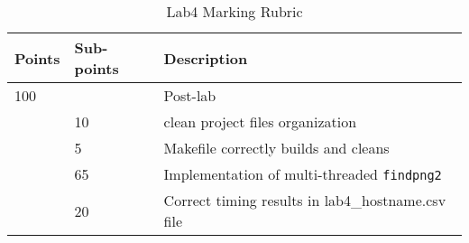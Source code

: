 \begin{table}[ht]
\begin{center}
\begin{tabular}{|p{2cm}|p{2cm}|p{9cm}|}
\hline
Points & Sub-points &Description  \\ \hline
100    &       & Post-lab \\ \hline
       & 10    & clean project files organization \\ \hline
       & 5     & Makefile correctly builds and cleans \\ \hline
       & 65    & Implementation of multi-threaded \verb+findpng2+ \\ \hline
       & 20    & Correct timing results in lab4\_hostname.csv file\\ \hline
\end{tabular}
\caption{Lab4 Marking Rubric}
\label{tb_lab4_rubric}
\end{center}
\end{table}

